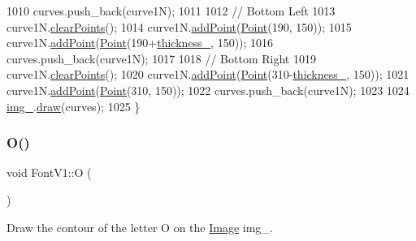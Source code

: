\begin{DoxyCode}
1010     curves.push\_back(curve1N);
1011 
1012     \textcolor{comment}{// Bottom Left}
1013     curve1N.\mbox{\hyperlink{class_bezier_curve_a0ba8ce66d5af5971ae6a1b506029728e}{clearPoints}}();
1014     curve1N.\mbox{\hyperlink{class_bezier_curve_a38d16c18b36ae45619b05e26e226cf34}{addPoint}}(\mbox{\hyperlink{class_point}{Point}}(190, 150));
1015     curve1N.\mbox{\hyperlink{class_bezier_curve_a38d16c18b36ae45619b05e26e226cf34}{addPoint}}(\mbox{\hyperlink{class_point}{Point}}(190+\mbox{\hyperlink{class_font_v1_aed8040e76be9a52833627b92f0fb4e5f}{thickness\_}}, 150));
1016     curves.push\_back(curve1N);
1017 
1018     \textcolor{comment}{// Bottom Right}
1019     curve1N.\mbox{\hyperlink{class_bezier_curve_a0ba8ce66d5af5971ae6a1b506029728e}{clearPoints}}();
1020     curve1N.\mbox{\hyperlink{class_bezier_curve_a38d16c18b36ae45619b05e26e226cf34}{addPoint}}(\mbox{\hyperlink{class_point}{Point}}(310-\mbox{\hyperlink{class_font_v1_aed8040e76be9a52833627b92f0fb4e5f}{thickness\_}}, 150));
1021     curve1N.\mbox{\hyperlink{class_bezier_curve_a38d16c18b36ae45619b05e26e226cf34}{addPoint}}(\mbox{\hyperlink{class_point}{Point}}(310, 150));
1022     curves.push\_back(curve1N);
1023 
1024     \mbox{\hyperlink{class_font_v1_a00569e3e3c4b70f437b63f396f735fb0}{img\_}}.\mbox{\hyperlink{class_image_a8d162f3cab956131d58708c09aa560b0}{draw}}(curves);
1025 \}
\end{DoxyCode}
\mbox{\label{class_font_v1_a9338f8d780e9913a848310355973ebf3}} 
\subsubsection{\texorpdfstring{O()}{O()}}
{\footnotesize\ttfamily void Font\+V1\+::O (\begin{DoxyParamCaption}{ }\end{DoxyParamCaption})}



Draw the contour of the letter O on the \mbox{\hyperlink{class_image}{Image}} img\+\_\+. 


